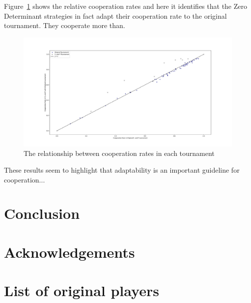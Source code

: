 \documentclass{article}
\begin{document}
Figure~\ref{fig:sp_relative_cooperation_rates} shows the relative
cooperation rates and here it identifies that the Zero Determinant strategies in
fact adapt their cooperation rate to the original tournament. They cooperate
more than.

\begin{figure}[!hbtp]
    \centering
    \includegraphics[width=.8\textwidth]{assets/sp_relative_cooperation_rates.pdf}
    \caption{The relationship between cooperation rates in each tournament}
    \label{fig:sp_relative_cooperation_rates}
\end{figure}

These results seem to highlight that adaptability is an important guideline for
cooperation...

\section{Conclusion}\label{sec:conclusion}


\section*{Acknowledgements}





\appendix

\section{List of original players}\label{app:list_of_original_players}


\begin{multicols}{2}
    \begin{enumerate}
            
    \end{enumerate}
\end{multicols}
\end{document}
